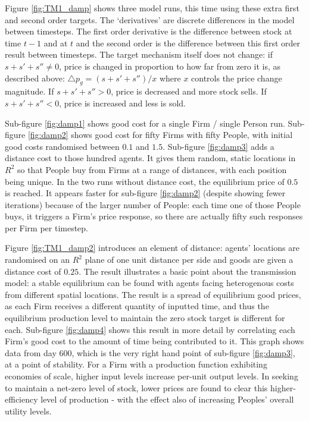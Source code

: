 Figure \ref{fig:TM1_damp} shows three model runs, this time using these extra first and second order targets. The `derivatives' are discrete differences in the model between timesteps. The first order derivative is the difference between stock at time $t-1$ and at $t$ and the second order is the difference between this first order result between timesteps. The target mechanism itself does not change: if $s + s' + s'' \neq 0$, price is changed in proportion to how far from zero it is, as described above: $\triangle p_g = (s + s' + s'') /x$ where $x$ controls the price change magnitude. If $s + s' + s'' > 0$, price is decreased and more stock sells. If $s + s' + s'' < 0$, price is increased and less is sold. 

Sub-figure \ref{fig:damp1} shows good cost for a single Firm / single Person run. Sub-figure \ref{fig:damp2} shows good cost for fifty Firms with fifty People, with initial good costs randomised between $0.1$ and $1.5$. Sub-figure \ref{fig:damp3} adds a distance cost to those hundred agents. It gives them random, static locations in $R^2$ so that People buy from Firms at a range of distances, with each position being unique. In the two runs without distance cost, the equilibrium price of $0.5$ is reached. It appears faster for sub-figure \ref{fig:damp2} (despite showing fewer iterations) because of the larger number of People: each time one of those People buys, it triggers a Firm's price response, so there are actually fifty such responses per Firm per timestep.

Figure \ref{fig:TM1_damp2} introduces an element of distance: agents' locations are randomised on an $R^2$ plane of one unit distance per side and goods are given a distance cost of $0.25$. The result illustrates a basic point about the transmission model: a stable equilibrium can be found with agents facing heterogenous costs from different spatial locations. The result is a spread of equilibrium good prices, as each Firm receives a different quantity of inputted time, and thus the equilibrium production level to maintain the zero stock target is different for each. Sub-figure \ref{fig:damp4} shows this result in more detail by correlating each Firm's good cost to the amount of time being contributed to it. This graph shows data from day $600$, which is the very right hand point of sub-figure \ref{fig:damp3}, at a point of stability. For a Firm with a production function exhibiting economies of scale, higher input levels increase per-unit output levels. In seeking to maintain a net-zero level of stock, lower prices are found to clear this higher-efficiency level of production - with the effect also of increasing Peoples' overall utility levels.

